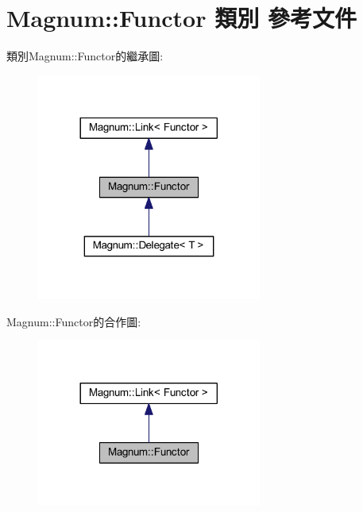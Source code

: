 \hypertarget{class_magnum_1_1_functor}{}\section{Magnum\+:\+:Functor 類別 參考文件}
\label{class_magnum_1_1_functor}


類別\+Magnum\+:\+:Functor的繼承圖\+:\nopagebreak
\begin{figure}[H]
\begin{center}
\leavevmode
\includegraphics[width=209pt]{class_magnum_1_1_functor__inherit__graph}
\end{center}
\end{figure}


Magnum\+:\+:Functor的合作圖\+:\nopagebreak
\begin{figure}[H]
\begin{center}
\leavevmode
\includegraphics[width=209pt]{class_magnum_1_1_functor__coll__graph}
\end{center}
\end{figure}

